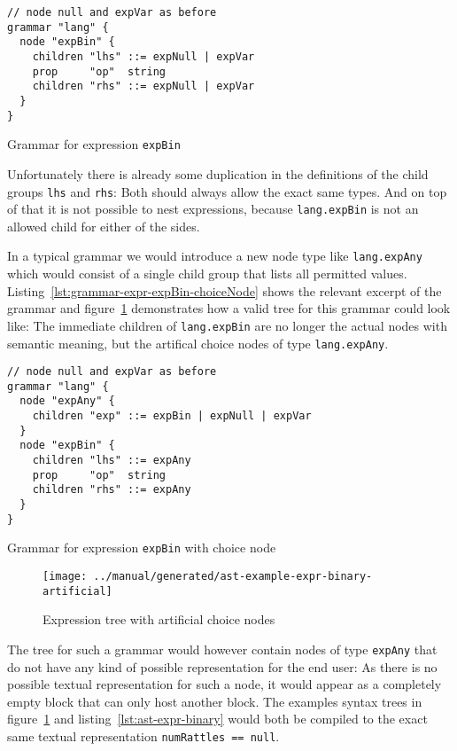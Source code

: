 \documentclass[sigconf,natbib=false,review=true,anonymous]{acmart}
\newcommand\astScale{0.75}
\begin{document}
\begin{listing}[H]
\begin{verbatim}
// node null and expVar as before
grammar "lang" {
  node "expBin" {
    children "lhs" ::= expNull | expVar
    prop     "op"  string
    children "rhs" ::= expNull | expVar
  }
}
\end{verbatim}
\caption{Grammar for expression \texttt{expBin}}
\label{lst:grammar-expr-expBin-verbose}
\end{listing}

Unfortunately there is already some duplication in the definitions of the child groups \texttt{lhs} and \texttt{rhs}: Both should always allow the exact same types. And on top of that it is not possible to nest expressions, because \texttt{lang.expBin} is not an allowed child for either of the sides.

In a typical grammar we would introduce a new node type like \texttt{lang.expAny} which would consist of a single child group that lists all permitted values. Listing~\ref{lst:grammar-expr-expBin-choiceNode} shows the relevant excerpt of the grammar and figure~\ref{fig:ast-choice-node} demonstrates how a valid tree for this grammar could look like: The immediate children of \texttt{lang.expBin} are no longer the actual nodes with semantic meaning, but the artifical choice nodes of type \texttt{lang.expAny}.

\begin{listing}[H]
\begin{verbatim}
// node null and expVar as before
grammar "lang" {
  node "expAny" {
    children "exp" ::= expBin | expNull | expVar
  }
  node "expBin" {
    children "lhs" ::= expAny
    prop     "op"  string
    children "rhs" ::= expAny
  }
}
\end{verbatim}
\caption{Grammar for expression \texttt{expBin} with choice node}
\label{lst:grammar-expr-expBin-choiceNode}
\end{listing}

\begin{figure}
  \texttt{[image: ../manual/generated/ast-example-expr-binary-artificial]}
  \caption{Expression tree with artificial choice nodes}
  \label{fig:ast-choice-node}
\end{figure}

The tree for such a grammar would however contain nodes of type \texttt{expAny} that do not have any kind of possible representation for the end user: As there is no possible textual representation for such a node, it would appear as a completely empty block that can only host another block. The examples syntax trees in  figure~\ref{fig:ast-choice-node} and listing~\ref{lst:ast-expr-binary} would both be compiled to the exact same textual representation \texttt{numRattles == null}.
\end{document}
